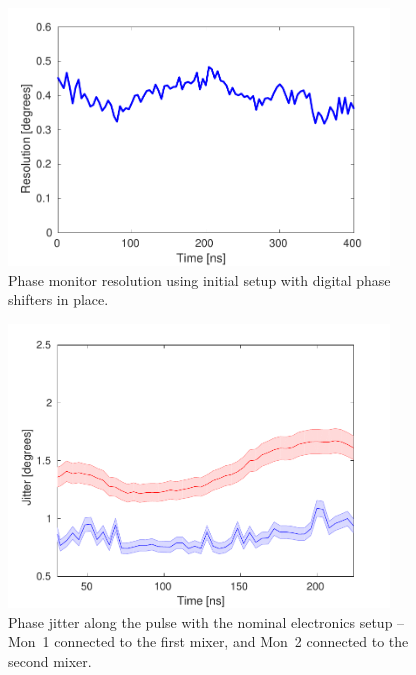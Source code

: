 
\begin{figure}
  \centering
  \includegraphics[width=0.9\textwidth]{Figures/phaseMons/resolutionDigShift}
  \caption{Phase monitor resolution using initial setup with digital phase shifters in place.}
  \label{f:resolutionDigShift}
\end{figure}

\begin{figure}
  \centering
  \includegraphics[width=0.9\textwidth]{Figures/phaseMons/Mix1Mon1_Mix2Mon2}
  \caption{Phase jitter along the pulse with the nominal electronics setup -- Mon~1 connected to the first mixer, and Mon~2 connected to the second mixer.}
  \label{f:Mix1Mon1_Mix2Mon2}
\end{figure}

